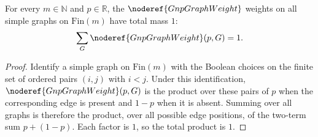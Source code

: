 \begin{helper}
For every \(m\in\mathbb N\) and \(p\in\mathbb R\), the
\(\noderef{GnpGraphWeight}\) weights on all simple graphs on \(\mathrm{Fin}(m)\)
have total mass \(1\):
\[
\sum_G \noderef{GnpGraphWeight}(p,G)=1.
\]
\end{helper}
\begin{proof}
Identify a simple graph on \(\mathrm{Fin}(m)\) with the Boolean choices on the
finite set of ordered pairs \((i,j)\) with \(i<j\).  Under this identification,
\(\noderef{GnpGraphWeight}(p,G)\) is the product over these pairs of \(p\) when
the corresponding edge is present and \(1-p\) when it is absent.  Summing over
all graphs is therefore the product, over all possible edge positions, of the
two-term sum \(p+(1-p)\).  Each factor is \(1\), so the total product is \(1\).
\end{proof}
